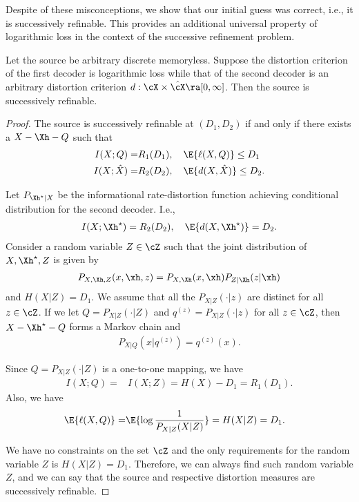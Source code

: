 \documentclass[draftclsnofoot, onecolumn, letterpaper, romanappendices]{IEEEtran}
\begin{document}
Despite of these misconceptions, we show that our initial guess was correct, i.e., it is successively refinable.
This provides an additional universal property of logarithmic loss
in the context of the successive refinement problem.

\begin{theorem}\label{thm:successive refinability of log loss}
    Let the source be arbitrary discrete memoryless.
    Suppose the distortion criterion of the first decoder is logarithmic loss
    while that of the second decoder is an arbitrary distortion criterion
    $d:\cX\times\hat{\cX}\ra[0,\infty]$.
    Then the source is successively refinable.
\end{theorem}
\begin{proof}
    The source is successively refinable at $(D_1,D_2)$ if and only if
    there exists a $X-\Xh-Q$ such that
    \begin{align*}
        I(X;Q) =& R_1(D_1), \quad \E{\ell(X,Q)}\leq D_1\\
        I(X;\hat{X}) =& R_2(D_2), \quad \E{d(X,\hat{X})}\leq D_2.
    \end{align*}

    Let $P_{\Xh^\star|X}$ be the informational rate-distortion function achieving
    conditional distribution for the second decoder.
    I.e.,
    \begin{align*}
        I(X;\Xh^\star) = R_2(D_2), \quad \E{d(X,\Xh^\star)}=D_2.
    \end{align*}
    Consider a random variable $Z\in\cZ$ such that the joint distribution of
    $X,\Xh^\star,Z$ is given by
    \begin{align*}
        P_{X,\Xh,Z}(x,\xh,z) = P_{X,\Xh}(x,\xh)P_{Z|\Xh}(z|\xh)
    \end{align*}
    and $H(X|Z) = D_1$.
    We assume that all the $P_{X|Z}(\cdot|z)$ are distinct for all $z\in\cZ$.
    If we let $Q =  P_{X|Z}(\cdot|Z)$ and $q^{(z)} = P_{X|Z}(\cdot|z)$ for all $z\in\cZ$,
    then $X-\Xh^\star-Q$ forms a Markov chain and
    \begin{align*}
        P_{X|Q}(x| q^{(z)}) = q^{(z)}(x).
    \end{align*}
    
    Since $Q = P_{X|Z}(\cdot|Z)$ is a one-to-one mapping, we have
    \begin{align*}
        I(X;Q) =& I(X;Z)= H(X) -D_1= R_1(D_1).
    \end{align*}
    Also, we have
    \begin{align*}
        \E{\ell(X,Q)} =& \E{\log\frac{1}{P_{X|Z}(X|Z)}}= H(X|Z)= D_1.
    \end{align*}
    
    We have no constraints on the set $\cZ$ and the only requirements for
    the random variable $Z$ is $H(X|Z) = D_1$.
    Therefore, we can always find such random variable $Z$,
    and we can say that the source and respective distortion measures are successively refinable.
\end{proof}
\end{document}
